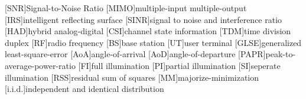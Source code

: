 \documentclass[12pt,draftclsnofoot,onecolumn,journal]{IEEEtran}
\begin{document}
\begin{acronym}
 [\ensuremath{\mathrm{SNR}}]{Signal-to-Noise Ratio}
 [MIMO]{multiple-input multiple-output}
 [IRS]{intelligent reflecting surface}
 [SINR]{signal to noise and interference ratio}
 [HAD]{hybrid analog-digital}
 [CSI]{channel state information}
 [TDM]{time division duplex}
 [RF]{radio frequency}
 [BS]{base station}
 [UT]{user terminal}
 [GLSE]{generalized least-square-error}
 [AoA]{angle-of-arrival}
 [AoD]{angle-of-departure}
 [PAPR]{peak-to-average-power-ratio}
 [FI]{full illumination}
 [PI]{partial illumination}
 [SI]{seperate illumination}
 [RSS]{residual sum of squares}
 [MM]{majorize-minimization}
  [i.i.d.]{independent and identical distribution}
\end{acronym}

	

\end{document}
